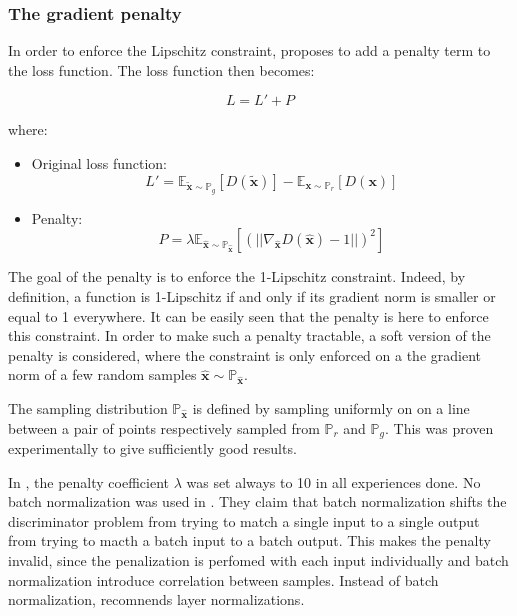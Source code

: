 \documentclass{article}
\begin{document}
\subsubsection{The gradient penalty}

In order to enforce the Lipschitz constraint, \cite{DBLP:journals/corr/GulrajaniAADC17} proposes to add a penalty term to the loss function. The loss function then becomes: 

\begin{equation}
    L = L' + P
\end{equation}

where:

\begin{itemize}
    \item Original loss function: 
    \begin{equation}
        L' = \mathbb{E}_{\mathbf{\tilde{x}} \sim \mathbb{P}_g} [D(\mathbf{\tilde{x}})] - \mathbb{E}_{\mathbf{x} \sim \mathbb{P}_r} [D(\mathbf{x})]
    \end{equation}
    \item Penalty:
    \begin{equation}
        P = \lambda \mathbb{E}_{\hat{\mathbf{x}} \sim \mathbb{P}_{\hat{\mathbf{x}}}}[(||\nabla_{\hat{\mathbf{x}}} D(\hat{\mathbf{x}})-1||)^2]
    \end{equation}
\end{itemize}

The goal of the penalty is to enforce the 1-Lipschitz constraint. Indeed, by definition, a function is 1-Lipschitz if and only if its gradient norm is smaller or equal to 1 everywhere. It can be easily seen that the penalty is here to enforce this constraint. In order to make such a penalty tractable, a soft version of the penalty is considered, where the constraint is only enforced on a the gradient norm of a few random samples $\hat{\mathbf{x}} \sim \mathbb{P}_{\hat{\mathbf{x}}}$.

The sampling distribution $\mathbb{P}_{\hat{\mathbf{x}}}$ is defined by sampling uniformly on on a line between a pair of points respectively sampled from $\mathbb{P}_{r}$ and $\mathbb{P}_{g}$. This was proven experimentally to give sufficiently good results.

In \cite{DBLP:journals/corr/GulrajaniAADC17}, the penalty coefficient $\lambda$ was set always to 10 in all experiences done. No batch normalization was used in \cite{DBLP:journals/corr/GulrajaniAADC17}. They claim that batch normalization shifts the discriminator problem from trying to match a single input to a single output from trying to macth a batch input to a batch output. This makes the penalty invalid, since the penalization is perfomed with each input individually and batch normalization introduce correlation between samples. Instead of batch normalization, \cite{DBLP:journals/corr/GulrajaniAADC17} recomnends layer normalizations.
\end{document}
